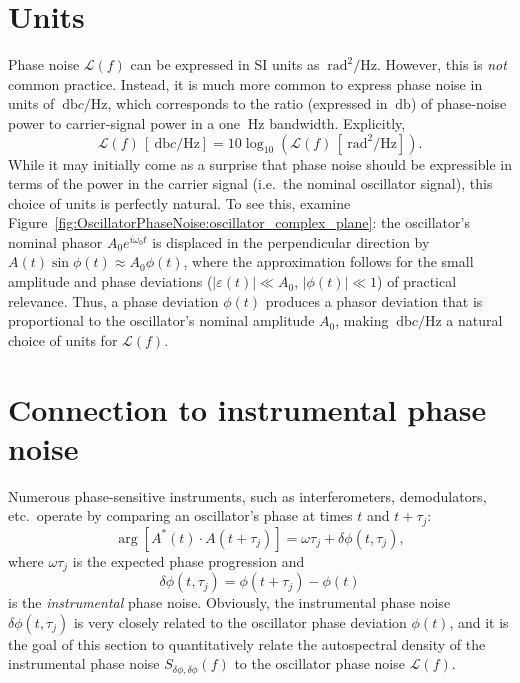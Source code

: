 \section{Units}
Phase noise $\mathcal{L}(f)$ can be expressed in SI units
as $\SI{}{\radian\squared\per\hertz}$.
However, this is \emph{not} common practice.
Instead, it is much more common to express phase noise in units of
$\SI{}{\decibel c \per\hertz}$, which
corresponds to the ratio (expressed in $\SI{}{\decibel}$)
of phase-noise power to carrier-signal power
in a one $\SI{}{\hertz}$ bandwidth.
Explicitly,
\begin{equation}
  \mathcal{L}(f) \, [\SI{}{\decibel c \per\hertz}]
  =
  10 \log_{10} \left(%
    \mathcal{L}(f) \, [\SI{}{\radian\squared\per\hertz}]
  \right).
\end{equation}
While it may initially come as a surprise that
phase noise should be expressible in terms
of the power in the carrier signal
(i.e.\ the nominal oscillator signal),
this choice of units is perfectly natural.
To see this, examine
Figure~\ref{fig:OscillatorPhaseNoise:oscillator_complex_plane}:
the oscillator's nominal phasor $A_0 e^{i \omega_0 t}$
is displaced in the perpendicular direction
by $A(t) \sin\phi(t) \approx A_0 \phi(t)$, where
the approximation follows for the small amplitude and phase deviations
($|\varepsilon(t)| \ll A_0$, $|\phi(t)| \ll 1$) of practical relevance.
Thus, a phase deviation $\phi(t)$ produces a phasor deviation
that is proportional to the oscillator's nominal amplitude $A_0$,
making $\SI{}{\decibel c \per\hertz}$
a natural choice of units for $\mathcal{L}(f)$.


\section{Connection to instrumental phase noise}
Numerous phase-sensitive instruments,
such as interferometers, demodulators, etc.\,
operate by comparing an oscillator's phase
at times $t$ and $t + \tau_j$:
\begin{equation}
  \arg[A^*(t) \cdot A(t + \tau_j)]
  =
  \omega \tau_j + \delta \phi(t, \tau_j),
\end{equation}
where $\omega \tau_j$ is the expected phase progression and
\begin{equation}
  \delta \phi(t, \tau_j) = \phi(t + \tau_j) - \phi(t)
\end{equation}
is the \emph{instrumental} phase noise.
Obviously, the instrumental phase noise $\delta\phi(t, \tau_j)$
is very closely related to the oscillator phase deviation $\phi(t)$, and
it is the goal of this section
to quantitatively relate the autospectral density
of the instrumental phase noise $S_{\delta\phi,\delta\phi}(f)$
to the oscillator phase noise $\mathcal{L}(f)$.


